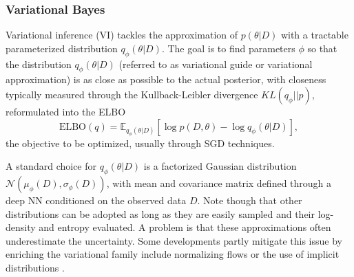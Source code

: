 \subsubsection{Variational Bayes} 

Variational inference (VI) \cite{blei2017variational} tackles the 
 approximation of  $p(\theta | D)$ with a tractable parameterized
 distribution $q_{\phi}(\theta |D)$. The goal is to find parameters $\phi$ so that the distribution 
$q_{\phi}(\theta |D )$  (referred to as variational guide
or variational approximation)  is as close as possible to the actual posterior, with closeness typically measured through 
the Kullback-Leibler 
divergence $KL(q_{\phi } || p)$, reformulated into the ELBO
\begin{equation}\label{eq:elbo}
\mbox{ELBO}(q) = \mathbb{E}_{q_{\phi}(\theta |D)} \left[ \log p(D,\theta ) - \log q_{\phi}(\theta |D)\right],
\end{equation}
the objective to be optimized,
usually through SGD techniques. 

A standard choice
for $q_{\phi}(\theta |D )$ is a factorized Gaussian 
distribution $\mathcal{N}(\mu_{\phi}(D), \sigma_{\phi}(D))$,
with  mean and covariance matrix defined through a
 deep NN conditioned on the observed data $D$.
 Note though that 
other distributions can be adopted as long as they 
 are easily sampled and their log-density and entropy evaluated. 
A problem is that these approximations often 
underestimate the uncertainty. Some developments
partly mitigate this  issue
by  enriching the variational family include normalizing flows \cite{rezende2015variational} or the use of implicit distributions \cite{huszar2017variational}.

